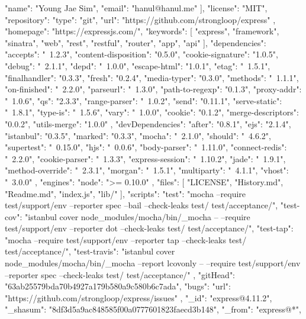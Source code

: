 {   {
      "name": "Young Jae Sim",
      "email": "hanul@hanul.me"
   } ],
   "license": "MIT", "repository": {
      "type": "git",
      "url": "https://github.com/strongloop/express"
   },
   "homepage": "https://expressjs.com/", "keywords": [
      "express",
      "framework",
      "sinatra",
      "web",
      "rest",
      "restful",
      "router",
      "app",
      "api"
   ],
   "dependencies": {
      "accepts": "~1.2.3",
      "content-disposition": "0.5.0",
      "cookie-signature": "1.0.5",
      "debug": "~2.1.1",
      "depd": "~1.0.0",
      "escape-html": "1.0.1",
      "etag": "~1.5.1",
      "finalhandler": "0.3.3",
      "fresh": "0.2.4",
      "media-typer": "0.3.0",
      "methods": "~1.1.1",
      "on-finished": "~2.2.0",
      "parseurl": "~1.3.0",
      "path-to-regexp": "0.1.3",
      "proxy-addr": "~1.0.6",
      "qs": "2.3.3",
      "range-parser": "~1.0.2",
      "send": "0.11.1",
      "serve-static": "~1.8.1",
      "type-is": "~1.5.6",
      "vary": "~1.0.0",
      "cookie": "0.1.2",
      "merge-descriptors": "0.0.2",
      "utils-merge": "1.0.0"
   },
   "devDependencies": {
      "after": "0.8.1",
      "ejs": "2.1.4",
      "istanbul": "0.3.5",
      "marked": "0.3.3",
      "mocha": "~2.1.0",
      "should": "~4.6.2",
      "supertest": "~0.15.0",
      "hjs": "~0.0.6",
      "body-parser": "~1.11.0",
      "connect-redis": "~2.2.0",
      "cookie-parser": "~1.3.3",
      "express-session": "~1.10.2",
      "jade": "~1.9.1",
      "method-override": "~2.3.1",
      "morgan": "~1.5.1",
      "multiparty": "~4.1.1",
      "vhost": "~3.0.0"
   },
   "engines": {
      "node": ">= 0.10.0"
   },
   "files": [
      "LICENSE",
      "History.md",
      "Readme.md",
      "index.js",
      "lib/"
   ],
   "scripts": {
      "test": "mocha --require test/support/env
         --reporter spec --bail --check-leaks test/ test/acceptance/",
      "test-cov": "istanbul cover node_modules/mocha/bin/_mocha
         -- --require test/support/env --reporter dot --check-leaks test/ test/acceptance/",
      "test-tap": "mocha --require test/support/env
         --reporter tap --check-leaks test/ test/acceptance/",
      "test-travis": "istanbul cover node_modules/mocha/bin/_mocha
         --report lcovonly -- --require test/support/env
         --reporter spec --check-leaks test/ test/acceptance/"
   },
   "gitHead": "63ab25579bda70b4927a179b580a9c580b6c7ada",
   "bugs": {
      "url": "https://github.com/strongloop/express/issues"
   },
   "_id": "express@4.11.2",
   "_shasum": "8df3d5a9ac848585f00a0777601823faecd3b148",
   "_from": "express@*",
}
